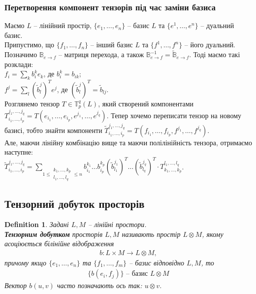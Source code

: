 \documentclass[a4paper, 10pt]{article}
\theoremstyle{theoremdd}
\newtheorem{definition}[theorem]{Definition}
\begin{document}
\subsubsection*{Перетворення компонент тензорів під час заміни базиса}
Маємо $L$ -- лінійний простір, $\{e_1,\dots,e_n\}$ -- базис $L$ та $\{e^1,\dots,e^n\}$ -- дуальний базис.\\
Припустимо, що $\{f_1,\dots,f_n\}$ -- інший базис $L$ та $\{f^1,\dots,f^n\}$ -- його дуальний.\\
Позначимо $\mathbb{B}_{e \to f}$ -- матриця перехода, а також $\mathbb{B}^{-1}_{e \to f} = \tilde{\mathbb{B}}_{e \to f}$. Тоді маємо такі розклади:\\
$f_i = \displaystyle\sum_k b_i^k e_k$, де $b_i^k = b_{ik}$;\\
$f^j = \displaystyle\sum_l (\tilde{b}^j_l)^T e^j$, де $(\tilde{b}^j_l)^T = \tilde{b}_{lj}$.\\
Розглянемо тензор $T \in \mathbb{T}_p^q(L)$, який створений компонентами $T_{i_1,\dots,i_p}^{j_1,\dots,j_q} = T(e_{i_1},\dots,e_{i_p}, e^{j_1},\dots,e^{j_q})$. Тепер хочемо переписати тензор на новому базисі, тобто знайти компоненти $\tilde{T}_{i_1,\dots,i_p}^{j_1,\dots,j_q} = T(f_{i_1},\dots,f_{i_p},f^{j_1},\dots,f^{j_q})$.\\
Але, маючи лінійну комбінацію вище та маючи полілінійність тензора, отримаємо наступне:\\
$\tilde{T}_{i_1,\dots,i_p}^{j_1,\dots,j_q} = \displaystyle\sum_{1 \leq \substack{k_1,\dots,k_p \\ l_1,\dots,l_q} \leq n} b_{i_1}^{k_1} \dots b_{i_p}^{k_p} (\tilde{b}_{l_1}^{j_1})^T \dots (\tilde{b}_{l_q}^{j_q})^T \cdot T_{k_1,\dots,k_p}^{l_1,\dots,l_q}$.

\subsection{Тензорний добуток просторів}
\begin{definition}
Задані $L,M$ -- лінійні простори.\\
\textbf{Тензорним добутком} просторів $L,M$ називають простір $L \otimes M$, якому асоціюється білінійне відображення
\begin{align*}
b \colon L \times M \to L \otimes M,
\end{align*}
причому якщо $\{e_1,\dots,e_n\}$ та $\{f_1,\dots,f_m\}$ -- базис відповідно $L,M$, то
\begin{align*}
\{ b(e_i,f_j) \} \text{ -- базис } L \otimes M
\end{align*}
Вектор $b(u,v)$ часто позначають ось так: $u \otimes v$.
\end{definition}
\end{document}
